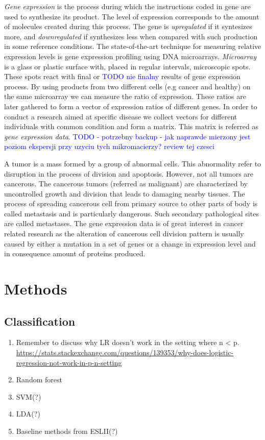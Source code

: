 \documentclass[12pt, wide]{mwart}
\begin{document}
\textit{Gene expression} is the process during which the instructions coded in gene are used to synthesize its product. The level of expression corresponds to the amount of molecules created during this process. The gene is \textit{upregulated} if it syntesizes more, and \textit{downregulated} if synthesizes less when compared with such production in some reference conditions. The state-of-the-art technique for measuring relative expression levels is gene expression profiling using DNA microarrays. \textit{Microarray} is a glass or plastic surface with, placed in regular intervals, microscopic spots. These spots react with final or \textcolor{blue}{TODO nie finalny} results of gene expression process. By using products from two different cells (e.g cancer and healthy) on the same microarray we can measure the ratio of expression. These ratios are later gathered to form a vector of expression ratios of different genes. In order to conduct a research aimed at specific disease we collect vectors for different individuals with common condition and form a matrix. This matrix is referred as \textit{gene expression data}. \textcolor{blue}{TODO - potrzebny backup - jak naprawde mierzony jest poziom ekspersji przy uzyciu tych mikromacierzy? review tej czesci}

A tumor is a mass formed by a group of abnormal cells. This abnormality refer to disruption in the process of division and apoptosis. However, not all tumors are cancerous. The cancerous tumors (referred as malignant) are characterized by uncontrolled growth and division that leads to damaging nearby tissues. The process of spreading cancerous cell from primary source to other parts of body is called metastasis and is particularly dangerous. Such secondary pathological sites are called metastases. The gene expression data is of great interest in cancer related research as the alteration of cancerous cell division pattern is usually caused by either a mutation in a set of genes or a change in expression level and in consequence amount of proteins produced. 

\section{Methods}

\subsection{Classification}

\begin{enumerate}
    \item Remember to discuss why LR doesn't work in the setting where n < p. \url{https://stats.stackexchange.com/questions/139353/why-does-logistic-regression-not-work-in-p-n-setting}
    \item Random forest
    \item SVM(?)
    \item LDA(?)
    \item Baseline methods from ESLII(?)
\end{enumerate}
\end{document}
